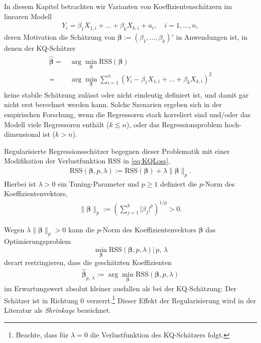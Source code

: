 \documentclass[
  a4paper,
  DIV=11,
  oneside]{scrreprt}
\begin{document}
In diesem Kapitel betrachten wir Varianten von Koeffizientenschätzern im
linearen Modell \begin{align}
 Y_i = \beta_1 X_{1,i} + \dots + \beta_k X_{k,i} + u_i, \quad i = 1,\dots,n,\label{eq:slm}
\end{align} deren Motivation die Schätzung von
\(\boldsymbol{\beta} := (\beta_1, \dots,\beta_k)'\) in Anwendungen ist,
in denen der KQ-Schätzer \begin{align}
  \begin{split}
  \widehat{\boldsymbol{\beta}} =&\, \arg\min_{\boldsymbol{\beta}}\mathrm{RSS}(\boldsymbol{\beta})\\ 
  =&\,  \arg\min_{\boldsymbol{\beta}}  \sum_{i=1}^n\left(Y_i-\beta_1 X_{1,i} + \dots + \beta_k X_{k,i}\right)^2
  \end{split}\label{eq:KQLoss}
\end{align} keine stabile Schätzung zulässt oder nicht eindeutig
definiert ist, und damit gar nicht erst berechnet werden kann. Solche
Szenarien ergeben sich in der empirischen Forschung, wenn die
Regressoren stark korreliert sind und/oder das Modell viele Regressoren
enthält (\(k\lesssim n\)), oder das Regressionsproblem hoch-dimensional
ist (\(k>n\)).

Regularisierte Regressionsschätzer begegnen dieser Problematik mit einer
Modifikation der Verlustfunktion \(\mathrm{RSS}\) in \eqref{eq:KQLoss},
\begin{align}
  \mathrm{RSS}(\boldsymbol{\beta}, p, \lambda) := \mathrm{RSS}(\boldsymbol{\beta}) + \lambda\lVert\boldsymbol{\beta}\rVert_p.
\end{align} Hierbei ist \(\lambda>0\) ein Tuning-Parameter und
\(p\geq1\) definiert die \(p\)-Norm des Koeffizientenvektors,
\begin{align}
  \lVert\boldsymbol{\beta}\rVert_p := \left(\sum_{j=1}^k \lvert\beta_j\rvert^{p}\right)^{1/p}>0.\label{eq:pnorm}
\end{align}

Wegen \(\lambda\lVert\boldsymbol{\beta}\rVert_p>0\) kann die \(p\)-Norm
des Koeffizientenvektors \(\boldsymbol{\beta}\) das Optimierungsproblem
\[\min_{\boldsymbol{\beta}} \mathrm{RSS}(\boldsymbol{\beta}, p, \lambda) \vert\, p,\, \lambda\]
derart restringieren, dass die geschätzten Koeffizienten \begin{align*}
  \widehat{\boldsymbol{\beta}}_{p,\,\lambda} := \arg\min_{\boldsymbol{\beta}} \mathrm{RSS}(\boldsymbol{\beta}, p, \lambda)
\end{align*} im Erwartungswert absolut kleiner ausfallen als bei der
KQ-Schätzung: Der Schätzer ist in Richtung 0 verzerrt.\footnote{Beachte,
  dass für \(\lambda=0\) die Verlustfunktion des KQ-Schätzers folgt.}
Dieser Effekt der Regularisierung wird in der Literatur als
\emph{Shrinkage} bezeichnet.
\end{document}
